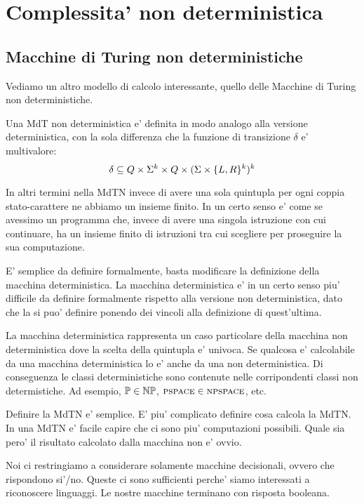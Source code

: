 \chapter{Complessita' non deterministica}

\section{Macchine di Turing non deterministiche}

Vediamo un altro modello di calcolo interessante, quello delle Macchine di Turing non
deterministiche.

Una MdT non deterministica e' definita in modo analogo alla versione deterministica, con la sola
differenza che la funzione di transizione $\delta$ e' multivalore:
\begin{equation*}
    \delta \subseteq Q \times \Sigma^{k} \times Q \times (\Sigma \times \{L,R\}^{k})^{k}
\end{equation*}

In altri termini nella MdTN invece di avere una sola quintupla per ogni coppia stato-carattere ne
abbiamo un insieme finito. In un certo senso e' come se avessimo un programma che, invece di avere
una singola istruzione con cui continuare, ha un insieme finito di istruzioni tra cui scegliere per
proseguire la sua computazione.

E' semplice da definire formalmente, basta modificare la definizione della macchina deterministica.
La macchina deterministica e' in un certo senso piu' difficile da definire formalmente rispetto alla
versione non deterministica, dato che la si puo' definire ponendo dei vincoli alla definizione di
quest'ultima.

La macchina deterministica rappresenta un caso particolare della macchina non deterministica dove la
scelta della quintupla e' univoca. Se qualcosa e' calcolabile da una macchina deterministica lo e'
anche da una non deterministica. Di conseguenza le classi deterministiche sono contenute nelle
corripondenti classi non determistiche. Ad esempio, $\mathbb{P} \in \mathbb{NP}$, $\textsc{pspace} \in \textsc{npspace}$,
etc.

Definire la MdTN e' semplice. E' piu' complicato definire cosa calcola la MdTN. In una MdTN e'
facile capire che ci sono piu' computazioni possibili. Quale sia pero' il risultato calcolato dalla
macchina non e' ovvio.

Noi ci restringiamo a considerare solamente macchine decisionali, ovvero che rispondono si'/no.
Queste ci sono sufficienti perche' siamo interessati a riconoscere linguaggi. Le nostre macchine
terminano con risposta booleana.

